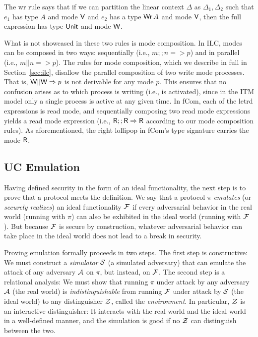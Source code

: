 The wr rule says that if we can partition the linear context $\Delta$ as $\Delta_1, \Delta_2$
such that $e_1$ has type $A$ and mode $\textsf{V}$ and $e_2$ has a type $\text{\textsf{Wr}}\,A$ and
mode $\textsf{V}$, then the full expression has type $\text{\textsf{Unit}}$ and mode $\textsf{W}$.

What is not showcased in these two rules is mode composition. In ILC, modes can
be composed in two ways: sequentially (i.e., $m ;; n => p$) and in parallel
(i.e., $m || n => p$). The rules for mode composition, which we describe in full
in Section~\ref{sec:ilc}, disallow the parallel composition of two write mode
processes. That is, $\textsf{W} || \textsf{W} => p$ is not derivable for any mode $p$. This
ensures that no confusion arises as to which process is writing (i.e., is
activated), since in the ITM model only a single process is active at any given
time. In \textsf{fCom}, each of the letrd expressions is read mode, and
sequentially composing two read mode expressions yields a read mode expression
(i.e., $\textsf{R} ;; \textsf{R} => \textsf{R}$ according to our mode composition rules). As
aforementioned, the right lollipop in \textsf{fCom}'s type signature carries the
mode $\textsf{R}$.

\subsection{UC Emulation}
\label{subsec:emulation}

Having defined security in the form of an ideal functionality, the next step is
to prove that a protocol meets the definition. We say that a protocol $\pi$
\emph{emulates} (or \emph{securely realizes}) an ideal functionality $\mathcal{{F}}$ if
every adversarial behavior in the real world (running with $\pi$) can also be
exhibited in the ideal world (running with $\mathcal{{F}}$). But because $\mathcal{{F}}$ is
secure by construction, whatever adversarial behavior can take place in the
ideal world does not lead to a break in security.

Proving emulation formally proceeds in two steps. The first step is
constructive: We must construct a \emph{simulator} $\mathcal{{S}}$ (a simulated
adversary) that can emulate the attack of any adversary $\mathcal{{A}}$ on $\pi$, but
instead, on $\mathcal{{F}}$. The second step is a relational analysis: We must show
that running $\pi$ under attack by any adversary $\mathcal{{A}}$ (the real world) is
\emph{indistinguishable} from running $\mathcal{{F}}$ under attack by $\mathcal{{S}}$ (the
ideal world) to any distinguisher $\mathcal{{Z}}$, called the \emph{environment}. In
particular, $\mathcal{{Z}}$ is an interactive distinguisher: It interacts with the real
world and the ideal world in a well-defined manner, and the simulation is good
if no $\mathcal{{Z}}$ can distinguish between the two.

